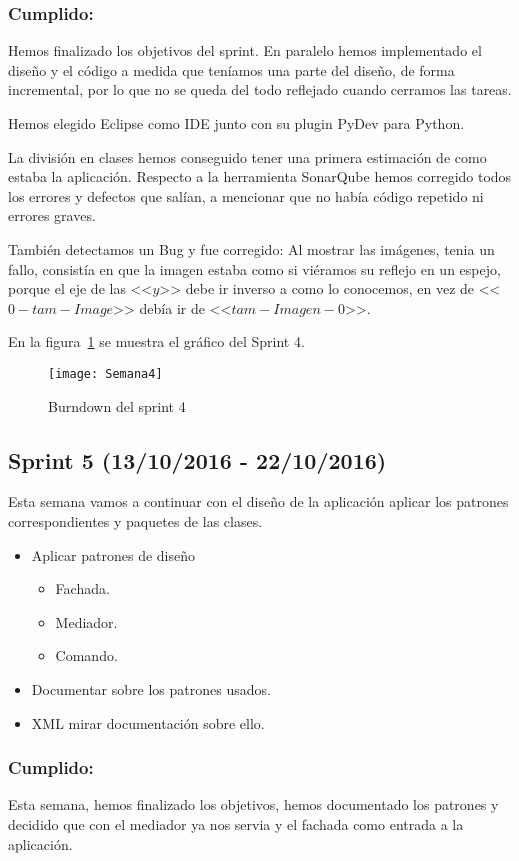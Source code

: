 \subsubsection{Cumplido:}
Hemos finalizado los objetivos del sprint.
En paralelo hemos implementado el diseño y el código a medida que teníamos una parte del diseño, de forma incremental, por lo que no se queda del todo reflejado cuando cerramos las tareas.

Hemos elegido Eclipse como IDE junto con su plugin PyDev para Python.

La división en clases hemos conseguido tener una primera estimación de como estaba la aplicación.
Respecto a la herramienta SonarQube hemos corregido todos los errores y defectos que salían, a mencionar que no había código repetido ni errores graves.

También detectamos un Bug y fue corregido:
Al mostrar las imágenes, tenia un fallo, consistía en que la imagen estaba como si viéramos su reflejo en un espejo, porque el eje de las <<$y$>> debe ir inverso a como lo conocemos, en vez de <<$0-tam-Image$>> debía ir de <<$tam-Imagen-0$>>.

En la figura~\ref{fig:A.2.4} se muestra el gráfico del Sprint 4.

\begin{figure}[h]
\centering
\texttt{[image: Semana4]}
\caption{Burndown del sprint 4}
\label{fig:A.2.4}
\end{figure}

\subsection{Sprint 5 (13/10/2016 - 22/10/2016)}
Esta semana vamos a continuar con el diseño de la aplicación aplicar los patrones correspondientes y paquetes de las clases.

\begin{itemize}
	\item Aplicar patrones de diseño
	\begin{itemize}
		\item Fachada.
		\item Mediador.
		\item Comando.
	\end{itemize}
	\item Documentar sobre los patrones usados.
	\item XML mirar documentación sobre ello.
\end{itemize}
\subsubsection{Cumplido:}
Esta semana, hemos finalizado los objetivos, hemos documentado los patrones y decidido que con el mediador ya nos servia y el fachada como entrada a la aplicación.
 
